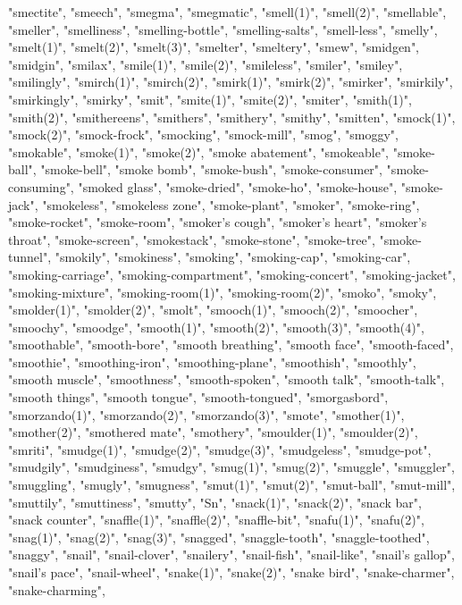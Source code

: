 "smectite",
"smeech",
"smegma",
"smegmatic",
"smell(1)",
"smell(2)",
"smellable",
"smeller",
"smelliness",
"smelling-bottle",
"smelling-salts",
"smell-less",
"smelly",
"smelt(1)",
"smelt(2)",
"smelt(3)",
"smelter",
"smeltery",
"smew",
"smidgen",
"smidgin",
"smilax",
"smile(1)",
"smile(2)",
"smileless",
"smiler",
"smiley",
"smilingly",
"smirch(1)",
"smirch(2)",
"smirk(1)",
"smirk(2)",
"smirker",
"smirkily",
"smirkingly",
"smirky",
"smit",
"smite(1)",
"smite(2)",
"smiter",
"smith(1)",
"smith(2)",
"smithereens",
"smithers",
"smithery",
"smithy",
"smitten",
"smock(1)",
"smock(2)",
"smock-frock",
"smocking",
"smock-mill",
"smog",
"smoggy",
"smokable",
"smoke(1)",
"smoke(2)",
"smoke abatement",
"smokeable",
"smoke-ball",
"smoke-bell",
"smoke bomb",
"smoke-bush",
"smoke-consumer",
"smoke-consuming",
"smoked glass",
"smoke-dried",
"smoke-ho",
"smoke-house",
"smoke-jack",
"smokeless",
"smokeless zone",
"smoke-plant",
"smoker",
"smoke-ring",
"smoke-rocket",
"smoke-room",
"smoker's cough",
"smoker's heart",
"smoker's throat",
"smoke-screen",
"smokestack",
"smoke-stone",
"smoke-tree",
"smoke-tunnel",
"smokily",
"smokiness",
"smoking",
"smoking-cap",
"smoking-car",
"smoking-carriage",
"smoking-compartment",
"smoking-concert",
"smoking-jacket",
"smoking-mixture",
"smoking-room(1)",
"smoking-room(2)",
"smoko",
"smoky",
"smolder(1)",
"smolder(2)",
"smolt",
"smooch(1)",
"smooch(2)",
"smoocher",
"smoochy",
"smoodge",
"smooth(1)",
"smooth(2)",
"smooth(3)",
"smooth(4)",
"smoothable",
"smooth-bore",
"smooth breathing",
"smooth face",
"smooth-faced",
"smoothie",
"smoothing-iron",
"smoothing-plane",
"smoothish",
"smoothly",
"smooth muscle",
"smoothness",
"smooth-spoken",
"smooth talk",
"smooth-talk",
"smooth things",
"smooth tongue",
"smooth-tongued",
"smorgasbord",
"smorzando(1)",
"smorzando(2)",
"smorzando(3)",
"smote",
"smother(1)",
"smother(2)",
"smothered mate",
"smothery",
"smoulder(1)",
"smoulder(2)",
"smriti",
"smudge(1)",
"smudge(2)",
"smudge(3)",
"smudgeless",
"smudge-pot",
"smudgily",
"smudginess",
"smudgy",
"smug(1)",
"smug(2)",
"smuggle",
"smuggler",
"smuggling",
"smugly",
"smugness",
"smut(1)",
"smut(2)",
"smut-ball",
"smut-mill",
"smuttily",
"smuttiness",
"smutty",
"Sn",
"snack(1)",
"snack(2)",
"snack bar",
"snack counter",
"snaffle(1)",
"snaffle(2)",
"snaffle-bit",
"snafu(1)",
"snafu(2)",
"snag(1)",
"snag(2)",
"snag(3)",
"snagged",
"snaggle-tooth",
"snaggle-toothed",
"snaggy",
"snail",
"snail-clover",
"snailery",
"snail-fish",
"snail-like",
"snail's gallop",
"snail's pace",
"snail-wheel",
"snake(1)",
"snake(2)",
"snake bird",
"snake-charmer",
"snake-charming",
